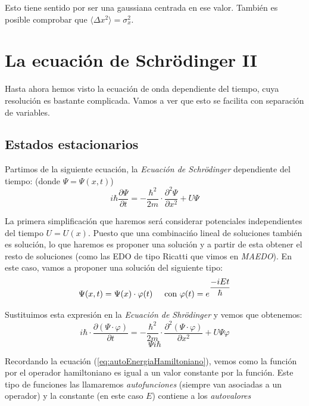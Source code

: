 \documentclass{report}
\begin{document}
{\begin{enumerate}
              Esto tiene sentido por ser una gaussiana centrada en ese valor. También
              es posible comprobar que $\langle \Delta x^2\rangle=\sigma_x^2$. 
      \end{enumerate}
    }
\chapter{La ecuación de Schrödinger II}
  \noindent Hasta ahora hemos visto la ecuación de onda dependiente del tiempo, cuya 
  resolución es bastante complicada. Vamos a ver que esto se facilita con separación 
  de variables.\\
  \section{Estados estacionarios}
    \noindent Partimos de la siguiente ecuación, la \textit{Ecuación de Schrödinger} 
    dependiente del tiempo: (donde $\Psi=\Psi(x,t)$)\\
    \[i\hbar\dfrac{\partial\Psi}{\partial t}=-\dfrac{\hbar^2}{2m}\cdot
    \dfrac{\partial^2\Psi}{\partial x^2}+U\Psi\]

    \noindent La primera simplificación que haremos será considerar potenciales 
    independientes del tiempo $U=U(x)$. Puesto que una combinacińo lineal de soluciones
    también es solución, lo que haremos es proponer una solución y a partir de esta
    obtener el resto de soluciones (como las EDO de tipo Ricatti que vimos en 
    \textit{MAEDO}). En este caso, vamos a proponer una solución del siguiente tipo:
    \[\Psi(x,t)=\Psi(x)\cdot\varphi(t)\hspace{0.5cm}\text{con } 
    \varphi(t)=e^{\dfrac{-iEt}{\hbar}}\]

    

    \noindent Sustituimos esta expresión en la \textit{Ecuación de Shrödinger} y vemos
    que obtenemos:
    \[i\hbar\cdot\dfrac{\partial(\Psi\cdot\varphi)}{\partial t}=-\dfrac{\hbar^2}{2m}
    \cdot\dfrac{\partial^2(\Psi\cdot\varphi)}{\partial x^2}+U\Psi\varphi\]
    \[\Psi i\hbar\]

    \noindent Recordando la ecuación (\ref{eq:autoEnergiaHamiltoniano}), vemos como la función por el operador hamiltoniano
    es igual a un valor constante por la función. Este tipo de funciones las llamaremos
    \textit{autofunciones} (siempre van asociadas a un operador) y la constante (en este
    caso $E$) contiene a los \textit{autovalores}\\
\end{document}

